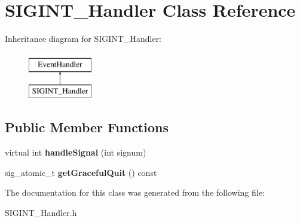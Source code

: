 \hypertarget{classSIGINT__Handler}{\section{S\-I\-G\-I\-N\-T\-\_\-\-Handler Class Reference}
\label{classSIGINT__Handler}
}
Inheritance diagram for S\-I\-G\-I\-N\-T\-\_\-\-Handler\-:\begin{figure}[H]
\begin{center}
\leavevmode
\includegraphics[height=2.000000cm]{classSIGINT__Handler}
\end{center}
\end{figure}
\subsection*{Public Member Functions}
\begin{DoxyCompactItemize}
\item 
\hypertarget{classSIGINT__Handler_a0bac7e6d02c1fb09c9795c5282b1c98a}{virtual int {\bfseries handle\-Signal} (int signum)}\label{classSIGINT__Handler_a0bac7e6d02c1fb09c9795c5282b1c98a}

\item 
\hypertarget{classSIGINT__Handler_a0e63db035673b15d289c45076f54f682}{sig\-\_\-atomic\-\_\-t {\bfseries get\-Graceful\-Quit} () const }\label{classSIGINT__Handler_a0e63db035673b15d289c45076f54f682}

\end{DoxyCompactItemize}


The documentation for this class was generated from the following file\-:\begin{DoxyCompactItemize}
\item 
S\-I\-G\-I\-N\-T\-\_\-\-Handler.\-h\end{DoxyCompactItemize}
